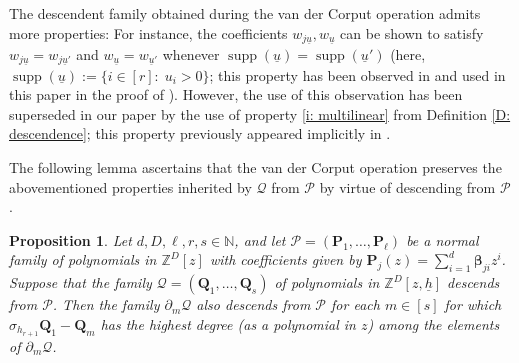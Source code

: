 \documentclass[11pt]{amsart}
\newtheorem{proposition}[lemma]{Proposition}
\theoremstyle{definition}
\newcommand{\N}{{\mathbb N}}
\newcommand{\Z}{{\mathbb Z}}
\newcommand{\CP}{{\mathcal P}}
\newcommand{\CQ}{{\mathcal Q}}
\newcommand{\bp}{{\textbf{P}}}
\newcommand{\p}{{\textbf{P}}}
\newcommand{\q}{{\textbf{Q}}}
\newcommand{\bbeta}{{\boldsymbol{\beta}}}
\newcommand{\uh}{{\underline{h}}}
\newcommand{\uu}{{\underline{u}}}
\DeclareMathOperator{\supp}{supp}
\begin{document}
          
The descendent family obtained during the van der Corput operation admits more properties: For instance, the coefficients $w_{j\uu}, w_\uu$ can be shown to satisfy $w_{j\uu} = w_{j\uu'}$ and $w_\uu = w_{\uu'}$ whenever $\supp(\uu) = \supp(\uu')$ (here, $\supp(\uu):=\{i\in[r]:\; u_i>0\}$; this property has been observed in \cite[Definition 5.5 (P3)]{DKS22} and used in this paper in the proof of \cite[Proposition 5.7]{DKS22}). However, the use of this observation has been superseded in our paper by the use of property \eqref{i: multilinear} from Definition \ref{D: descendence}; this property previously appeared implicitly in \cite{Pel20, Ts22}.



    The following lemma ascertains that the van der Corput operation preserves the abovementioned properties inherited by $\CQ$ from $\CP$ by virtue of descending from $\CP$.
    \begin{proposition}\label{P: vdC preserves descendancy}
        Let $d, D, \ell,r, s\in\N$, and let $\CP = (\p_1, \ldots, \p_\ell)$ be a normal family of polynomials in $\Z^D[z]$ with coefficients given by $\bp_j(z) = \sum_{i=1}^d \bbeta_{ji}z^i$.
        Suppose that the family $\CQ = (\q_1, \ldots, \q_s)$ of polynomials in $\Z^D[z,\uh]$ descends from $\CP$. Then the family $\partial_m \CQ$ also descends from $\CP$ for each $m\in[s]$ for which $\sigma_{h_{r+1}}{\q}_1-{\q}_m$
        has the highest degree (as a polynomial in $z$) among the elements of $\partial_m \CQ$.
    \end{proposition}
 
\end{document}
